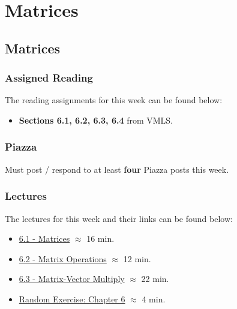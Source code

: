 \clearpage

\renewcommand{\ChapTitle}{Matrices}
\renewcommand{\SectionTitle}{Matrices}

\chapter{\ChapTitle}
\section{\SectionTitle}

\subsection{Assigned Reading}

The reading assignments for this week can be found below:

\begin{itemize}
    \item \textbf{Sections 6.1, 6.2, 6.3, 6.4} from VMLS.
\end{itemize}

\subsection{Piazza}

Must post / respond to at least \textbf{four} Piazza posts this week.  

\subsection{Lectures}

The lectures for this week and their links can be found below:

\begin{itemize}
    \item \href{https://applied.cs.colorado.edu/mod/hvp/view.php?id=50733}{6.1 - Matrices} $\approx$ 16 min.
    \item \href{https://applied.cs.colorado.edu/mod/hvp/view.php?id=50734}{6.2 - Matrix Operations} $\approx$ 12 min.
    \item \href{https://applied.cs.colorado.edu/mod/hvp/view.php?id=50735}{6.3 - Matrix-Vector Multiply} $\approx$ 22 min.
    \item \href{https://applied.cs.colorado.edu/mod/hvp/view.php?id=50736}{Random Exercise: Chapter 6} $\approx$ 4 min.
\end{itemize}

